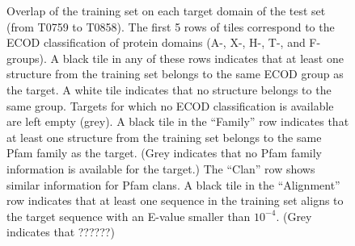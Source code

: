\begin{figure}[H]
%
    \caption{Overlap of the training set on each target domain of the
    test set (from T0759 to T0858). The first 5 rows of tiles
    correspond to the ECOD classification of protein domains (A-, X-,
    H-, T-, and F-groups). A black tile in any of these rows indicates
    that at least one structure from the training set belongs to the
    same ECOD group as the target. A white tile indicates that no
    structure belongs to the same group. Targets for which no ECOD
    classification is available are left empty (grey).
    A black tile in the ``Family'' row indicates that at least one
    structure from the training set belongs to the same Pfam family as
    the target. (Grey indicates that no Pfam family information is
    available for the target.) The ``Clan'' row shows similar
    information for Pfam clans. A black tile in the ``Alignment'' row
    indicates that at least one sequence in the training set aligns to
    the target sequence with an E-value smaller than $10^{-4}$. (Grey
    indicates that ??????)}
%
    \label{Fig:summaryTable}
\end{figure}
